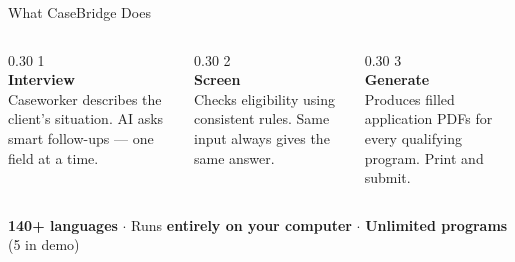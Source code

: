 \documentclass[aspectratio=169,11pt]{beamer}
\newcommand{\pill}[1]{%
  \tikz[baseline=(t.base)]{\node[fill=brand!10,text=brand,rounded corners=3pt,inner sep=3pt,font=\footnotesize\bfseries](t){#1};}%
}
\begin{document}
\begin{frame}{What CaseBridge Does}
\vspace{6pt}
\begin{center}
\end{center}
\vspace{8pt}
\begin{columns}[T]
  \begin{column}{0.30\textwidth}
    \centering
    {\color{brand}\Large 1}\\[2pt]
    {\small\textbf{Interview}}\\[4pt]
    {\color{muted}\footnotesize Caseworker describes the client's situation. AI asks smart follow-ups --- one field at a time.}
  \end{column}
  \begin{column}{0.30\textwidth}
    \centering
    {\color{brand}\Large 2}\\[2pt]
    {\small\textbf{Screen}}\\[4pt]
    {\color{muted}\footnotesize Checks eligibility using consistent rules. Same input always gives the same answer.}
  \end{column}
  \begin{column}{0.30\textwidth}
    \centering
    {\color{brand}\Large 3}\\[2pt]
    {\small\textbf{Generate}}\\[4pt]
    {\color{muted}\footnotesize Produces filled application PDFs for every qualifying program. Print and submit.}
  \end{column}
\end{columns}
\vspace{8pt}
\begin{center}
  {\footnotesize\color{muted} \textbf{140+ languages} $\cdot$ Runs \textbf{entirely on your computer} $\cdot$ \textbf{Unlimited programs} (5 in demo)}
\end{center}
\end{frame}
\end{document}
